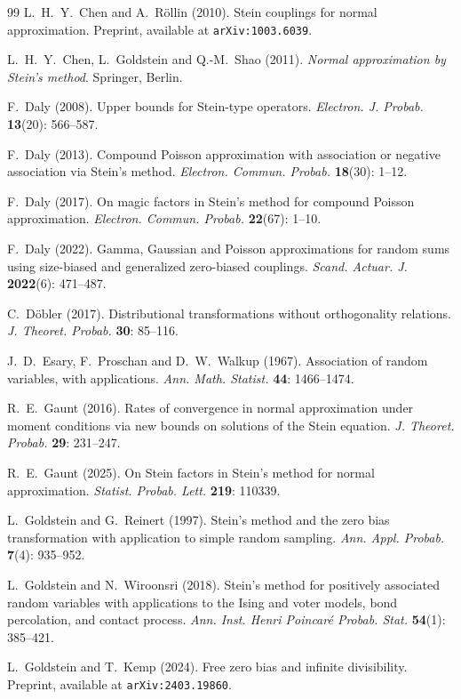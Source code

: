 \documentclass[12pt]{article}
\begin{document}
\begin{thebibliography}{99}
 L.~H.~Y.~Chen and A.~R\"ollin (2010). Stein couplings for normal approximation. Preprint, available at \texttt{arXiv:1003.6039}.

 L.~H.~Y.~Chen, L.~Goldstein and Q.-M.~Shao (2011). \emph{Normal approximation by Stein’s method}. Springer, Berlin.

 F.~Daly (2008). Upper bounds for Stein-type operators. \emph{Electron. J. Probab.} {\bf 13}(20): 566--587.

 F.~Daly (2013). Compound Poisson approximation with association or negative association via Stein's method. \emph{Electron. Commun. Probab.} {\bf 18}(30): 1--12.

 F.~Daly (2017). On magic factors in Stein's method for compound Poisson
approximation. \emph{Electron. Commun. Probab.} {\bf 22}(67): 1--10.

 F.~Daly (2022). Gamma, Gaussian and Poisson approximations for random sums using size-biased and generalized zero-biased couplings. \emph{Scand. Actuar. J.} {\bf 2022}(6): 471--487.

 C.~D\"obler (2017). Distributional transformations without orthogonality relations. \emph{J. Theoret. Probab.} {\bf 30}: 85--116.

 J.~D.~Esary, F.~Proschan and D.~W.~Walkup (1967). Association of random variables, with applications. \emph{Ann. Math. Statist.} {\bf 44}: 1466--1474.

 R.~E.~Gaunt (2016). Rates of convergence in normal approximation under moment conditions via new bounds on solutions of the Stein equation. \emph{J. Theoret. Probab.} {\bf 29}: 231--247.

 R.~E.~Gaunt (2025). On Stein factors in Stein’s method for normal approximation. \emph{Statist. Probab. Lett.} {\bf 219}: 110339.

 L.~Goldstein and G.~Reinert (1997). Stein's method and the zero bias transformation with application to simple random sampling. \emph{Ann. Appl. Probab.} {\bf 7}(4): 935--952.

 L.~Goldstein and N.~Wiroonsri (2018). Stein's method for positively associated random variables with applications to the Ising and voter models, bond percolation, and contact process. \emph{Ann. Inst. Henri Poincar\'e Probab. Stat.} {\bf 54}(1): 385--421.

 L.~Goldstein and T.~Kemp (2024). Free zero bias and infinite divisibility. Preprint, available at \texttt{arXiv:2403.19860}.


\end{thebibliography}
\end{document}
